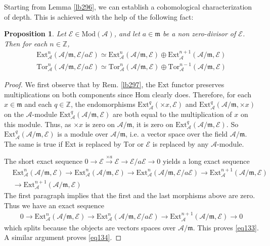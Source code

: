 \documentclass[12pt,b5paper,notitlepage]{report}
\theoremstyle{definition}
\theoremstyle{plain}
\newtheorem{pp}[df]{Proposition}
\newcommand{\mc}{\mathcal}
\newcommand{\Hom}{\mathrm{Hom}}
\newcommand{\Zbb}{\mathbb Z}
\newcommand{\Ext}{\mathrm{Ext}}
\newcommand{\Tor}{\mathrm{Tor}}
\newcommand{\Mod}{\mathrm{Mod}}
\newcommand{\mk}{\mathfrak m}
\numberwithin{equation}{section}
\begin{document}
Starting from Lemma \ref{lb296}, we can establish a cohomological characterization of depth. This is achieved with the help of the following fact:

\begin{pp}\label{lb298}
Let $\mc E\in\Mod(\mc A)$, and let $a\in\mk$ be a non zero-divisor of $\mc E$. Then for each $n\in\Zbb$,
\begin{gather}
\Ext_{\mc A}^n(\mc A/\mk,\mc E/a\mc E)\simeq \Ext_{\mc A}^n(\mc A/\mk,\mc E)\oplus\Ext_{\mc A}^{n+1}(\mc A/\mk,\mc E)  \label{eq133}\\[0.5ex]
\Tor_{\mc A}^n(\mc A/\mk,\mc E/a\mc E)\simeq \Tor_{\mc A}^n(\mc A/\mk,\mc E)\oplus \Tor_{\mc A}^{n-1}(\mc A/\mk,\mc E)\label{eq134}
\end{gather}
\end{pp}


\begin{proof}
We first observe that by Rem. \ref{lb297}, the $\Ext$ functor preserves multiplications on both components since $\Hom$ clearly does. Therefore, for each $x\in\mk$ and each $q\in\Zbb$, the endomorphisms $\Ext^q_{\mc A}(\times x,\mc E)$ and $\Ext^q_{\mc A}(\mc A/\mk,\times x)$  on the $\mc A$-module $\Ext^q_{\mc A}(\mc A/\mk,\mc E)$ are both equal to the multiplication of $x$ on this module. Thus, as $\times x$ is zero on $\mc A/\mk$, it is zero on $\Ext^q_{\mc A}(\mc A/\mk,\mc E)$. So $\Ext^q_{\mc A}(\mc A/\mk,\mc E)$ is a module over $\mc A/\mk$, i.e. a vector space over the field $\mc A/\mk$. The same is true if $\Ext$ is replaced by $\Tor$ or $\mc E$ is replaced by any $\mc A$-module.

The short exact sequence $0\rightarrow\mc E\xrightarrow{\times a}\mc E\rightarrow \mc E/a\mc E\rightarrow0$ yields a long exact sequence
\begin{align*}
&\Ext_{\mc A}^n(\mc A/\mk,\mc E)\rightarrow\Ext_{\mc A}^n(\mc A/\mk,\mc E)\rightarrow\Ext_{\mc A}^n(\mc A/\mk,\mc E/a\mc E)\rightarrow\Ext_{\mc A}^{n+1}(\mc A/\mk,\mc E)\\
&\rightarrow\Ext_{\mc A}^{n+1}(\mc A/\mk,\mc E)
\end{align*}
The first paragraph implies that the first and the last morphisms above are zero. Thus we have an exact sequence
\begin{align*}
0\rightarrow \Ext_{\mc A}^n(\mc A/\mk,\mc E)\rightarrow\Ext_{\mc A}^n(\mc A/\mk,\mc E/a\mc E)\rightarrow\Ext_{\mc A}^{n+1}(\mc A/\mk,\mc E)\rightarrow 0
\end{align*}
which splits because the objects are vectors spaces over $\mc A/\mk$. This proves \eqref{eq133}. A similar argument proves \eqref{eq134}.
\end{proof}
\end{document}
